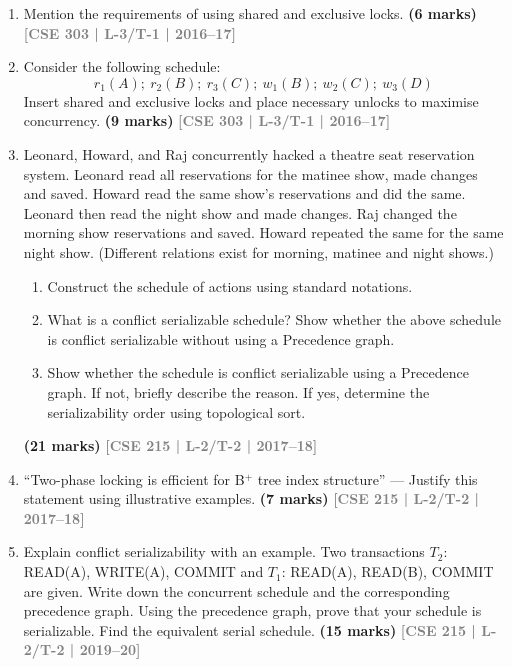 \documentclass[12pt,a3paper]{article}
\newcommand{\yr}[1]{\hfill\textcolor{gray}{\small\textbf{[#1]}}}
\newcommand{\mk}[1]{\textcolor{orange!70!black}{\small\textbf{(#1 marks)}}}
\begin{document}
\begin{enumerate}
\item Mention the requirements of using shared and exclusive locks.
\mk{6} \yr{CSE 303 | L-3/T-1 | 2016--17}

\item Consider the following schedule:
\[r_1(A);\ r_2(B);\ r_3(C);\ w_1(B);\ w_2(C);\ w_3(D)\]
Insert shared and exclusive locks and place necessary unlocks to maximise concurrency.
  \mk{9} \yr{CSE 303 | L-3/T-1 | 2016--17}

\item Leonard, Howard, and Raj concurrently hacked a theatre seat reservation system. Leonard read all reservations for the matinee show, made changes and saved. Howard read the same show's reservations and did the same. Leonard then read the night show and made changes. Raj changed the morning show reservations and saved. Howard repeated the same for the same night show. (Different relations exist for morning, matinee and night shows.)
\begin{enumerate}
  \item Construct the schedule of actions using standard notations.
  \item What is a conflict serializable schedule? Show whether the above schedule is conflict serializable without using a Precedence graph.
  \item Show whether the schedule is conflict serializable using a Precedence graph. If not, briefly describe the reason. If yes, determine the serializability order using topological sort.
\end{enumerate}
  \mk{21} \yr{CSE 215 | L-2/T-2 | 2017--18}

\item ``Two-phase locking is efficient for B$^+$ tree index structure'' --- Justify this statement using illustrative examples.
\mk{7} \yr{CSE 215 | L-2/T-2 | 2017--18}

\item Explain conflict serializability with an example. Two transactions $T_2$: READ(A), WRITE(A), COMMIT and $T_1$: READ(A), READ(B), COMMIT are given. Write down the concurrent schedule and the corresponding precedence graph. Using the precedence graph, prove that your schedule is serializable. Find the equivalent serial schedule.
\mk{15} \yr{CSE 215 | L-2/T-2 | 2019--20}


\end{enumerate}
\end{document}
